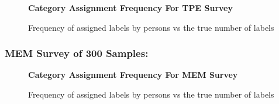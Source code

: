 \documentclass[runningheads,a4paper]{llncs}
\begin{document}
\begin{appendices}
\begin{figure}[h!]
    \begin{center}
    \textbf{Category Assignment Frequency For TPE Survey}
    \end{center}
    \caption{Frequency of assigned labels by persons vs the true number of labels}
\label{fig:freq-survey-2p}
\end{figure}

\subsubsection{MEM Survey of 300 Samples:}

\begin{figure}[htpb]
    \begin{center}
    \textbf{Category Assignment Frequency For MEM Survey}
    \end{center}
    \caption{Frequency of assigned labels by persons vs the true number of labels}
\label{fig:freq-survey-2p}
\end{figure} 


\end{appendices}
\end{document}
